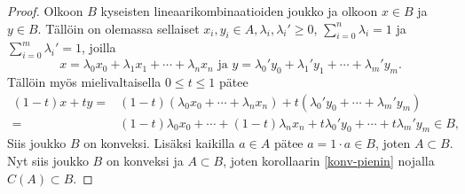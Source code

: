 \documentclass[12pt,a4paper,leqno]{report}
\newcommand{\R}{\mathbb{R}}
\theoremstyle{plain}
\theoremstyle{definition}
\theoremstyle{remark}
\begin{document}
\begin{proof}
Olkoon $B$ kyseisten lineaarikombinaatioiden joukko ja olkoon $x\in B$ ja $y\in B$. 
Tällöin on olemassa sellaiset $x_i,y_i\in A, \lambda_i,\lambda_i'\geq0$, $\sum_{i=0}^{n}{\lambda_i}=1$ ja $\sum_{i=0}^{m}{\lambda_i'}=1$, joilla
\begin{equation*}
x=\lambda_0 x_0+\lambda_1 x_1+\cdots+\lambda_{n} x_{n}\text{ ja }y=\lambda_0' y_0+\lambda_1' y_1+\cdots+\lambda_{m}' y_{m}.
\end{equation*} 
Tällöin myös mielivaltaisella $0\leq t \leq 1$ pätee
\begin{equation*}
\begin{split}
 (1-t)x+ty=&(1-t)(\lambda_0 x_0+\cdots+\lambda_{n} x_{n})+t(\lambda_0' y_0 +\cdots+\lambda_{m}' y_{m})\\
=&(1-t)\lambda_0 x_0+\cdots+(1-t)\lambda_{n} x_{n}+t\lambda_0' y_0+\cdots+t\lambda_{m}' y_{m}\in B,
\end{split}
\end{equation*} 
Siis joukko $B$ on konveksi.
Lisäksi kaikilla $a\in A$ pätee $a=1\cdot a \in B$, joten $A\subset B$. Nyt siis joukko $B$ on konveksi ja $A\subset B$, joten korollaarin \ref{konv-pienin} nojalla $C(A)\subset B$.
%
\end{proof}
\end{document}
